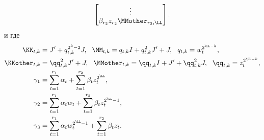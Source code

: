 \begin{corollary}
\[\begin{split}
\begin{bmatrix}
	\vdots \\
	\beta_{r_2} z_{r_2} \MMother_{r_2,\LL}
	\end{bmatrix}.
	\end{split}
	\]
	и где
	\begin{align*}
	\KK_{t,k} 
	&=
	J' + q_{t,k}^{2^{k}-2} J,~~
	\MM_{t,k} = q_{t,k}I + q_{t,k}^2 J' + J,~~
	q_{t,k} = w_t^{2^{\LL-k}},\\
	\KKother_{t,k} 
	&=
	\qq_{t,k}^2 J' + J,~~
	\MMother_{t,k} = \qq_{t,k} I + J' + \qq_{t,k}^{2} J,~~
	\qq_{t,k} = z_t^{2^{\LL-k}},\\
	\gamma_1 
	&=
	\sum_{t=1}^{r_1} \alpha_t + \sum_{t=1}^{r_2} \beta_t z_t^{2^\LL}, \\
	\gamma_2
	&=
	\sum_{t=1}^{r_1} \alpha_t w_{t}
	+
	\sum_{t=1}^{r_2} \beta_t z_t^{2^{\LL}-1}, \\
	\gamma_3 
	&=
	\sum_{t=1}^{r_1} \alpha_t w_{t}^{2^{\LL}-1} 
	+
	\sum_{t=1}^{r_2} \beta_t z_t.
	\end{align*}
\end{corollary}
